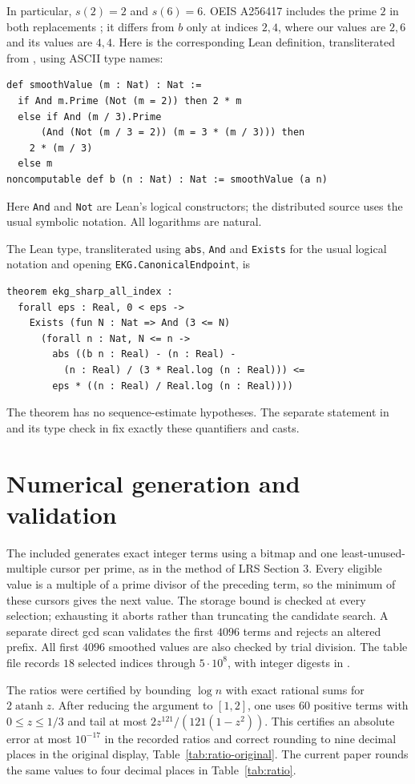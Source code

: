 In particular, $s(2)=2$ and $s(6)=6$. OEIS A256417 includes the prime
$2$ in both replacements \cite{oeis}; it differs from $b$ only at
indices $2,4$, where our values are $2,6$ and its values are $4,4$.
Here is the corresponding Lean definition, transliterated from
, using ASCII type names:
\begin{verbatim}
def smoothValue (m : Nat) : Nat :=
  if And m.Prime (Not (m = 2)) then 2 * m
  else if And (m / 3).Prime
      (And (Not (m / 3 = 2)) (m = 3 * (m / 3))) then
    2 * (m / 3)
  else m
noncomputable def b (n : Nat) : Nat := smoothValue (a n)
\end{verbatim}
Here \texttt{And} and \texttt{Not} are Lean's logical constructors;
the distributed source uses the usual symbolic notation. All logarithms are natural.

The Lean type, transliterated using \texttt{abs}, \texttt{And} and \texttt{Exists}
for the usual logical notation and opening \texttt{EKG.CanonicalEndpoint},
is
\begin{verbatim}
theorem ekg_sharp_all_index :
  forall eps : Real, 0 < eps ->
    Exists (fun N : Nat => And (3 <= N)
      (forall n : Nat, N <= n ->
        abs ((b n : Real) - (n : Real) -
          (n : Real) / (3 * Real.log (n : Real))) <=
        eps * ((n : Real) / Real.log (n : Real))))
\end{verbatim}
The theorem has no sequence-estimate hypotheses. The separate statement
in  and its type check in  fix
exactly these quantifiers and casts.


\section{Numerical generation and validation}
The included  generates exact integer
terms using a bitmap and one least-unused-multiple cursor per prime,
as in the method of LRS Section 3. Every eligible value is a multiple
of a prime divisor of the preceding term, so the minimum of these
cursors gives the next value. The storage bound is checked at every
selection; exhausting it aborts rather than truncating the candidate
search. A separate direct gcd scan validates the first $4096$ terms
and rejects an altered prefix. All first $4096$ smoothed values are
also checked by trial division. The table file records $18$ selected
indices through $5\cdot10^8$, with integer digests in
.

The ratios were certified by bounding $\log n$ with exact
rational sums for $2\operatorname{atanh}z$. After reducing the argument
to $[1,2]$, one uses $60$ positive terms with $0\leq z\leq1/3$ and tail
at most $2z^{121}/(121(1-z^2))$. This certifies an absolute error
at most $10^{-17}$ in the recorded ratios and correct rounding to
nine decimal places in the original display,
Table~\ref{tab:ratio-original}. The current paper rounds the same
values to four decimal places in Table~\ref{tab:ratio}.


